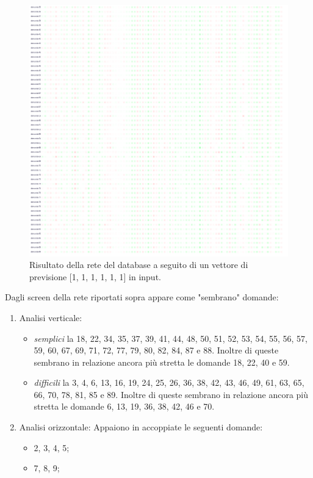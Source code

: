 \begin{itemize}
\begin{figure}[H]
\centering
	\includegraphics[width=0.90\linewidth]{./image/rete_db-vp1_2.png}
	\caption{Risultato della rete del database a seguito di un vettore di previsione [1, 1, 1, 1, 1, 1] in input.}
	\label{Risultato della rete del database a seguito di un vettore di previsione [1, 1, 1, 1, 1, 1] in input.}
\end{figure}
\noindent
Dagli screen della rete riportati sopra appare come "sembrano" domande:
\begin{enumerate}
\item Analisi verticale:
\begin{itemize}
\item \textit{semplici} la 18, 22, 34, 35, 37, 39, 41, 44, 48, 50, 51, 52, 53, 54, 55, 56, 57, 59, 60, 67, 69,  71, 72, 77, 79, 80, 82, 84, 87 e 88. Inoltre di queste sembrano in relazione ancora pi\`u stretta le domande 18, 22, 40 e 59.
\item \textit{difficili} la 3, 4, 6, 13, 16, 19, 24, 25, 26, 36, 38, 42, 43, 46, 49, 61, 63, 65, 66, 70, 78, 81, 85 e 89. Inoltre di queste sembrano in relazione ancora pi\`u stretta le domande 6, 13, 19, 36, 38, 42, 46 e 70.
\end{itemize}
\item Analisi orizzontale:
Appaiono in accoppiate le seguenti domande:
\begin{itemize}
\item 2, 3, 4, 5;
\item 7, 8, 9;

\end{itemize}
\end{enumerate}
\end{itemize}
